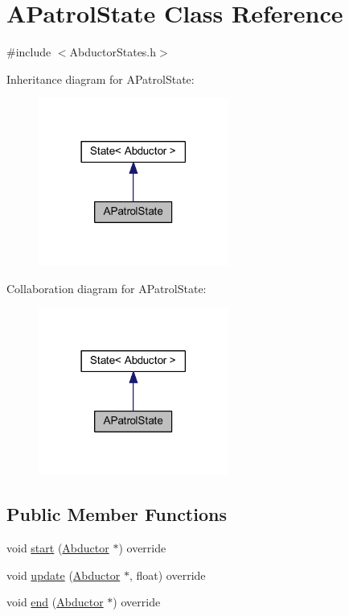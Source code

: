 \hypertarget{class_a_patrol_state}{}\section{A\+Patrol\+State Class Reference}
\label{class_a_patrol_state}


{\ttfamily \#include $<$Abductor\+States.\+h$>$}



Inheritance diagram for A\+Patrol\+State\+:
\nopagebreak
\begin{figure}[H]
\begin{center}
\leavevmode
\includegraphics[width=177pt]{class_a_patrol_state__inherit__graph}
\end{center}
\end{figure}


Collaboration diagram for A\+Patrol\+State\+:
\nopagebreak
\begin{figure}[H]
\begin{center}
\leavevmode
\includegraphics[width=177pt]{class_a_patrol_state__coll__graph}
\end{center}
\end{figure}
\subsection*{Public Member Functions}
\begin{DoxyCompactItemize}
\item 
void \hyperlink{class_a_patrol_state_ad8772aee88fa833b742c722138d33174}{start} (\hyperlink{class_abductor}{Abductor} $\ast$) override
\item 
void \hyperlink{class_a_patrol_state_adc21543780010bc78a157827a7e253b8}{update} (\hyperlink{class_abductor}{Abductor} $\ast$, float) override
\item 
void \hyperlink{class_a_patrol_state_ad4e43d5ad9c9aa4ec543b836b58c06e8}{end} (\hyperlink{class_abductor}{Abductor} $\ast$) override
\end{DoxyCompactItemize}
